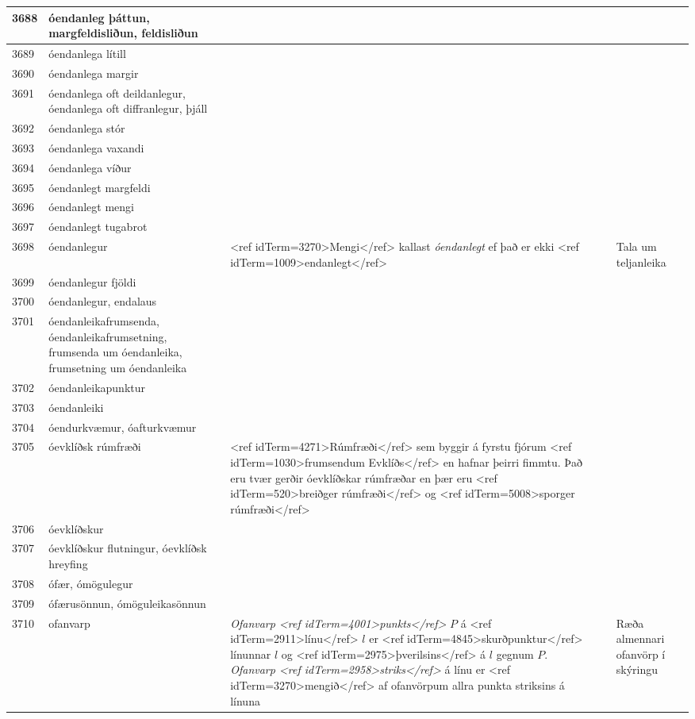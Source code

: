 \begin{longtable}{p{}|p{}|p{}|p{}|p{}}
\hline
3688 & óendanleg þáttun, margfeldisliðun, feldisliðun &  &  &  \\
\hline
3689 & óendanlega lítill &  &  &  \\
\hline
3690 & óendanlega margir &  &  &  \\
\hline
3691 & óendanlega oft deildanlegur, óendanlega oft diffranlegur, þjáll &  &  &  \\
\hline
3692 & óendanlega stór &  &  &  \\
\hline
3693 & óendanlega vaxandi &  &  &  \\
\hline
3694 & óendanlega víður &  &  &  \\
\hline
3695 & óendanlegt margfeldi &  &  &  \\
\hline
3696 & óendanlegt mengi &  &  &  \\
\hline
3697 & óendanlegt tugabrot &  &  &  \\
\hline
3698 & óendanlegur & <ref idTerm=3270>Mengi</ref> kallast \textit{óendanlegt} ef það er ekki <ref idTerm=1009>endanlegt</ref> &  & Tala um teljanleika \\
\hline
3699 & óendanlegur fjöldi &  &  &  \\
\hline
3700 & óendanlegur, endalaus &  &  &  \\
\hline
3701 & óendanleikafrumsenda, óendanleikafrumsetning, frumsenda um óendanleika, frumsetning um óendanleika &  &  &  \\
\hline
3702 & óendanleikapunktur &  &  &  \\
\hline
3703 & óendanleiki &  &  &  \\
\hline
3704 & óendurkvæmur, óafturkvæmur &  &  &  \\
\hline
3705 & óevklíðsk rúmfræði & <ref idTerm=4271>Rúmfræði</ref> sem byggir á fyrstu fjórum <ref idTerm=1030>frumsendum Evklíðs</ref> en hafnar þeirri fimmtu. Það eru tvær gerðir óevklíðskar rúmfræðar en þær eru <ref idTerm=520>breiðger rúmfræði</ref> og <ref idTerm=5008>sporger rúmfræði</ref> &  & \\
\hline
3706 & óevklíðskur &  &  &  \\
\hline
3707 & óevklíðskur flutningur, óevklíðsk hreyfing &  &  &  \\
\hline
3708 & ófær, ómögulegur &  &  &  \\
\hline
3709 & ófærusönnun, ómöguleikasönnun &  &  &  \\
\hline
3710 & ofanvarp & \textit{Ofanvarp <ref idTerm=4001>punkts</ref>} $P$ á <ref idTerm=2911>línu</ref> $l$ er <ref idTerm=4845>skurðpunktur</ref> línunnar $l$ og <ref idTerm=2975>þverilsins</ref> á $l$ gegnum $P$. \textit{Ofanvarp <ref idTerm=2958>striks</ref>} á línu er <ref idTerm=3270>mengið</ref> af ofanvörpum allra punkta striksins á línuna &  & Ræða almennari ofanvörp í skýringu \\

\end{longtable}
